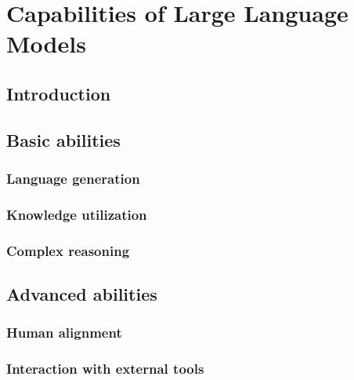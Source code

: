 
\chapter{Capabilities of Large Language Models}
\label{ch:capabilities}

\section{Introduction}
\label{sec:introduction}

\section{Basic abilities}
\label{sec:basic-abilities}

\subsection{Language generation}
\label{subsec:language-generation}

\subsection{Knowledge utilization}
\label{subsec:knowledge-utilization}

\subsection{Complex reasoning}
\label{subsec:complex-reasoning}

\section{Advanced abilities}
\label{sec:advanced-abilities}

\subsection{Human alignment}
\label{subsec:human-alignment}

\subsection{Interaction with external tools}
\label{subsec:interaction-with-external-tools}
